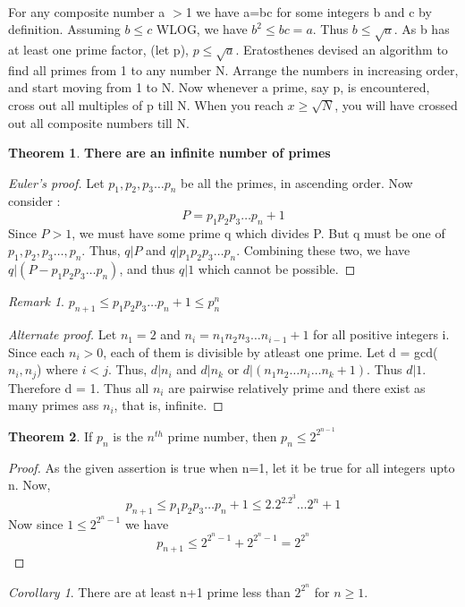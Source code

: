 \documentclass[15,a4paper]{report}
\theoremstyle{definition}
\newtheorem{theorem}{Theorem}[section]
\theoremstyle{remark}
\newtheorem*{remark}{Remark}
\newtheorem{corollary}{Corollary}[theorem]
\begin{document}
     \paragraph{} For any composite number a $>$1 we have a=bc for some integers b and c by definition. Assuming $b\leq c$ WLOG, we have $b^2 \leq bc =a$. Thus $b \leq \sqrt{a}$. As b has at least one prime factor, (let p), $p \leq \sqrt{a} $. Eratosthenes devised an algorithm to find all primes from 1 to any number N. Arrange the numbers in increasing order, and start moving from 1 to N. Now whenever a prime, say p, is encountered, cross out all multiples of p till N. When you reach $x \geq \sqrt{N}$, you will have crossed out all composite numbers till N.
    \begin{theorem}
        \textbf{There are an infinite number of primes}
    \end{theorem}
        \begin{proof}[Euler's proof]
            Let $p_1,p_2,p_3 \dots p_n$ be all the primes, in ascending order. Now consider : \[ P = p_1 p_2 p_3 \dots p_n +1 \]
            Since $P>1$, we must have some prime q which divides P. But q must be one of $p_1, p_2, p_3 \dots ,p_n$. Thus, $q|P$ and $q|p_1p_2p_3\dots p_n$. Combining these two, we have $q|(P-p_1p_2p_3\dots p_n)$, and thus $q|1$ which cannot be possible.
        \end{proof}
            \begin{remark}
                $p_{n+1} \leq p_1 p_2 p_3 \dots p_n +1 \leq p_n^n$
            \end{remark}
        \begin{proof}[Alternate proof]
            Let $n_1 = 2$ and $n_i = n_1n_2n_3 \dots n_{i-1} +1$ for all positive integers i. Since each $n_i > 0$, each of them is divisible by atleast one prime. Let d = gcd($n_i,n_j$) where $i<j$. Thus, $d|n_i$ and $d|n_k$ or $d|(n_1n_2\dots n_i \dots n_k +1)$. Thus $d|1$. Therefore d = 1. Thus all $n_i$ are pairwise relatively prime and there exist as many primes ass $n_i$, that is, infinite.
        \end{proof}
    \begin{theorem}
        If $p_n$ is the $n^{th}$ prime number, then $p_n \leq 2^{2^{n-1}}$
    \end{theorem}    
        \begin{proof}
            As the given assertion is true when n=1, let it be true for all integers upto n. Now, 
            \[ p_{n+1} \leq  p_1 p_2 p_3 \dots p_n +1 \leq 2.2^2.2^3 \dots 2^n +1\]
            Now since $1 \leq 2^{2^n -1}$ we have 
            \[ p_{n+1} \leq  2^{2^n-1} + 2^{2^n-1} = 2^{2^n}\]
        \end{proof}
        \begin{corollary}
            There are at least n+1 prime less than $2^{2^n} $ for $n\geq 1$.\\
        \end{corollary}
\newpage
\end{document}
